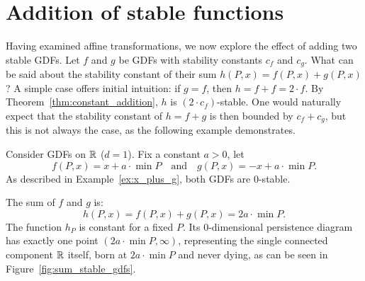 \section{Addition of stable functions}
\label{sec:addition_stable}

Having examined affine transformations, we now explore the effect of adding two
stable GDFs.
Let $f$ and $g$ be GDFs with stability constants $c_f$ and $c_g$.
What can be said about the stability constant of their sum
$h(P, x) = f(P, x) + g(P, x)$?
A simple case offers initial intuition:
if $g = f$, then $h = f + f = 2 \cdot f$.
By Theorem~\ref{thm:constant_addition}, $h$ is $(2 \cdot c_f)$-stable.
One would naturally expect that the stability constant of
$h = f + g$ is then bounded by $c_f + c_g$, but this is not always the case,
as the following example demonstrates.
\begin{example}
    Consider GDFs on $\mathbb{R}$ ($d = 1$).
    Fix a constant $a > 0$, let
    \begin{equation}
        f(P, x) = x + a \cdot \min P \quad \text{and} \quad g(P, x) = - x + a \cdot \min P.
    \end{equation}
    As described in Example~\ref{ex:x_plus_g}, both GDFs are $0$-stable.

    The sum of $f$ and $g$ is:
    \begin{equation}
        h(P, x) = f(P, x) + g(P, x) = 2a \cdot \min P.
    \end{equation}
    The function $h_P$ is constant for a fixed $P$.
    Its 0-dimensional persistence diagram has exactly one point
    $(2a \cdot \min P, \infty)$, representing the single connected component
    $\mathbb{R}$ itself, born at $2a \cdot \min P$ and never dying, as can be seen
    in Figure~\ref{fig:sum_stable_gdfs}.
    
    \begin{figure}
        \centering
\end{figure}
\end{example}

